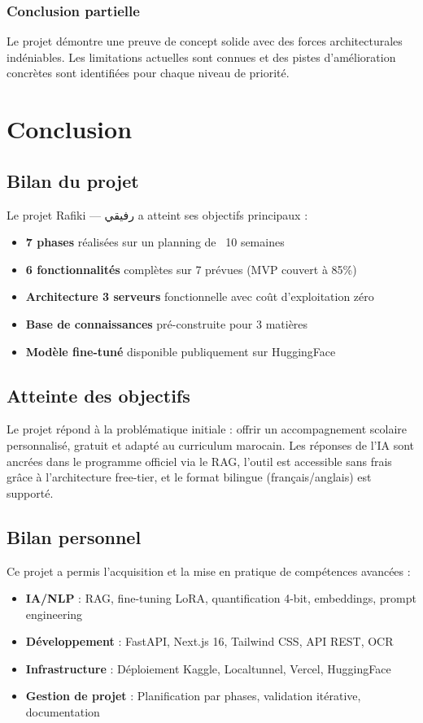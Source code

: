 \documentclass[12pt,a4paper]{report}
\begin{document}
\subsection*{Conclusion partielle}
Le projet démontre une preuve de concept solide avec des forces architecturales indéniables. Les limitations actuelles sont connues et des pistes d'amélioration concrètes sont identifiées pour chaque niveau de priorité.

\chapter{Conclusion}

\section{Bilan du projet}
Le projet Rafiki — رفيقي a atteint ses objectifs principaux :
\begin{itemize}
    \item \textbf{7 phases} réalisées sur un planning de ~10 semaines
    \item \textbf{6 fonctionnalités} complètes sur 7 prévues (MVP couvert à 85\%)
    \item \textbf{Architecture 3 serveurs} fonctionnelle avec coût d'exploitation zéro
    \item \textbf{Base de connaissances} pré-construite pour 3 matières
    \item \textbf{Modèle fine-tuné} disponible publiquement sur HuggingFace
\end{itemize}

\section{Atteinte des objectifs}
Le projet répond à la problématique initiale : offrir un accompagnement scolaire personnalisé, gratuit et adapté au curriculum marocain. Les réponses de l'IA sont ancrées dans le programme officiel via le RAG, l'outil est accessible sans frais grâce à l'architecture free-tier, et le format bilingue (français/anglais) est supporté.

\section{Bilan personnel}
Ce projet a permis l'acquisition et la mise en pratique de compétences avancées :
\begin{itemize}
    \item \textbf{IA/NLP} : RAG, fine-tuning LoRA, quantification 4-bit, embeddings, prompt engineering
    \item \textbf{Développement} : FastAPI, Next.js 16, Tailwind CSS, API REST, OCR
    \item \textbf{Infrastructure} : Déploiement Kaggle, Localtunnel, Vercel, HuggingFace
    \item \textbf{Gestion de projet} : Planification par phases, validation itérative, documentation
\end{itemize}
\end{document}
